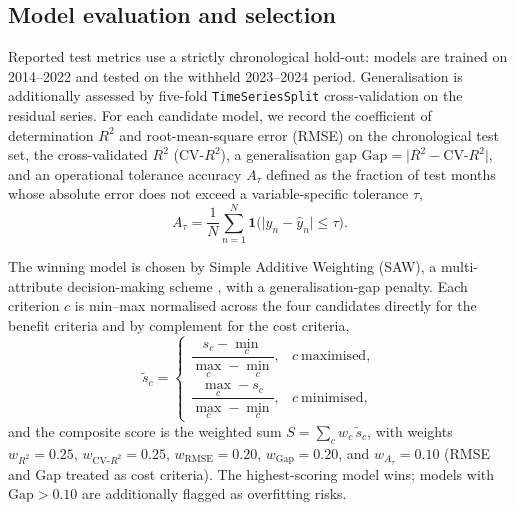 \documentclass[pdflatex,sn-basic,lineno]{sn-jnl}
\begin{document}
\subsection{Model evaluation and selection}\label{sec:saw}
Reported test metrics use a strictly chronological hold-out: models are trained
on 2014--2022 and tested on the withheld 2023--2024 period. Generalisation is
additionally assessed by five-fold \texttt{TimeSeriesSplit} cross-validation on
the residual series. For each candidate model, we record the coefficient of
determination $R^{2}$ and root-mean-square error (RMSE) on the chronological
test set, the cross-validated $R^{2}$ ($\mathrm{CV}\text{-}R^{2}$), a
generalisation gap $\mathrm{Gap}=\lvert R^{2}-\mathrm{CV}\text{-}R^{2}\rvert$,
and an operational tolerance accuracy $A_{\tau}$ defined as the fraction of test
months whose absolute error does not exceed a variable-specific tolerance
$\tau$,
\begin{equation}
A_{\tau}=\frac{1}{N}\sum_{n=1}^{N}\mathbf{1}\!\big(\lvert y_{n}-\hat{y}_{n}\rvert
\le \tau\big).
\end{equation}

The winning model is chosen by Simple Additive Weighting (SAW), a multi-attribute
decision-making scheme \citep{Hwang1981}, with a generalisation-gap penalty. Each criterion $c$ is min--max normalised across the
four candidates directly for the benefit criteria and by complement for the cost
criteria,
\begin{equation}
\tilde{s}_{c}=
\begin{cases}
\dfrac{s_{c}-\min_{c}}{\max_{c}-\min_{c}}, & c\ \text{maximised},\\[1.2ex]
\dfrac{\max_{c}-s_{c}}{\max_{c}-\min_{c}}, & c\ \text{minimised},
\end{cases}
\end{equation}
and the composite score is the weighted sum
$S=\sum_{c} w_{c}\,\tilde{s}_{c}$, with weights $w_{R^{2}}=0.25$,
$w_{\mathrm{CV}\text{-}R^{2}}=0.25$, $w_{\mathrm{RMSE}}=0.20$,
$w_{\mathrm{Gap}}=0.20$, and $w_{A_{\tau}}=0.10$ (RMSE and Gap treated as cost
criteria). The highest-scoring model wins; models with $\mathrm{Gap}>0.10$ are
additionally flagged as overfitting risks.
\end{document}

